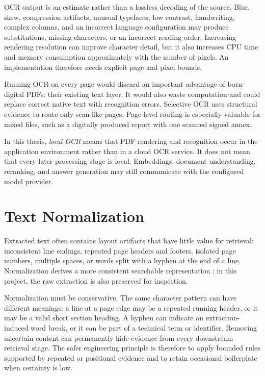 OCR output is an estimate rather than a lossless decoding of the source. Blur, skew, compression artifacts, unusual typefaces, low contrast, handwriting, complex columns, and an incorrect language configuration may produce substitutions, missing characters, or an incorrect reading order. Increasing rendering resolution can improve character detail, but it also increases CPU time and memory consumption approximately with the number of pixels. An implementation therefore needs explicit page and pixel bounds.

Running OCR on every page would discard an important advantage of born-digital PDFs: their existing text layer. It would also waste computation and could replace correct native text with recognition errors. Selective OCR uses structural evidence to route only scan-like pages. Page-level routing is especially valuable for mixed files, such as a digitally produced report with one scanned signed annex.

In this thesis, \emph{local OCR} means that PDF rendering and recognition occur in the application environment rather than in a cloud OCR service. It does not mean that every later processing stage is local. Embeddings, document understanding, reranking, and answer generation may still communicate with the configured model provider.

\section{Text Normalization}
\label{sec:background-normalization}

Extracted text often contains layout artifacts that have little value for retrieval: inconsistent line endings, repeated page headers and footers, isolated page numbers, multiple spaces, or words split with a hyphen at the end of a line. Normalization derives a more consistent searchable representation \cite{Manning2008IR}; in this project, the raw extraction is also preserved for inspection.

Normalization must be conservative. The same character pattern can have different meanings: a line at a page edge may be a repeated running header, or it may be a valid short section heading. A hyphen can indicate an extraction-induced word break, or it can be part of a technical term or identifier. Removing uncertain content can permanently hide evidence from every downstream retrieval stage. The safer engineering principle is therefore to apply bounded rules supported by repeated or positional evidence and to retain occasional boilerplate when certainty is low.

